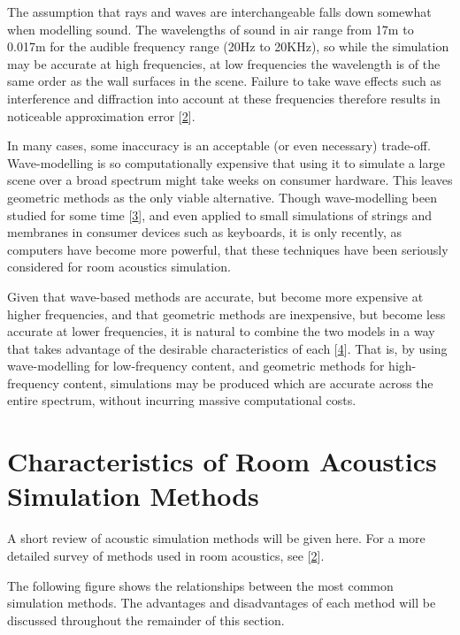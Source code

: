 \documentclass[]{scrreprt}
\begin{document}
The assumption that rays and waves are interchangeable falls down
somewhat when modelling sound. The wavelengths of sound in air range
from 17m to 0.017m for the audible frequency range (20Hz to 20KHz), so
while the simulation may be accurate at high frequencies, at low
frequencies the wavelength is of the same order as the wall surfaces in
the scene. Failure to take wave effects such as interference and
diffraction into account at these frequencies therefore results in
noticeable approximation error
{[}\protect\hyperlink{ref-saviojaux5foverviewux5f2015}{2}{]}.

In many cases, some inaccuracy is an acceptable (or even necessary)
trade-off. Wave-modelling is so computationally expensive that using it
to simulate a large scene over a broad spectrum might take weeks on
consumer hardware. This leaves geometric methods as the only viable
alternative. Though wave-modelling been studied for some time
{[}\protect\hyperlink{ref-smithux5fphysicalux5f1992}{3}{]}, and even
applied to small simulations of strings and membranes in consumer
devices such as keyboards, it is only recently, as computers have become
more powerful, that these techniques have been seriously considered for
room acoustics simulation.

Given that wave-based methods are accurate, but become more expensive at
higher frequencies, and that geometric methods are inexpensive, but
become less accurate at lower frequencies, it is natural to combine the
two models in a way that takes advantage of the desirable
characteristics of each
{[}\protect\hyperlink{ref-aretzux5fcombinedux5f2009}{4}{]}. That is, by
using wave-modelling for low-frequency content, and geometric methods
for high-frequency content, simulations may be produced which are
accurate across the entire spectrum, without incurring massive
computational costs.

\section{Characteristics of Room Acoustics Simulation
Methods}\label{characteristics-of-room-acoustics-simulation-methods}

A short review of acoustic simulation methods will be given here. For a
more detailed survey of methods used in room acoustics, see
{[}\protect\hyperlink{ref-saviojaux5foverviewux5f2015}{2}{]}.

The following figure \text{(\ref{fig:simulation_techniques})} shows the
relationships between the most common simulation methods. The advantages
and disadvantages of each method will be discussed throughout the
remainder of this section.
\end{document}
